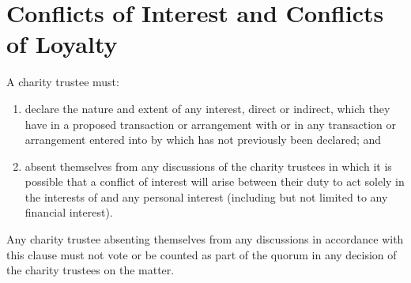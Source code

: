 \section{Conflicts of Interest and Conflicts of Loyalty}
\label{sec:conflicts}
A charity trustee must:
\begin{enumerate}
    \item declare the nature and extent of any interest, direct or indirect, which they have in a proposed transaction or arrangement with \shortname{} or in any transaction or arrangement entered into by \shortname{} which has not previously been declared; and
    \item absent themselves from any discussions of the charity trustees in which it is possible that a conflict of interest will arise between their duty to act solely in the interests of \shortname{} and any personal interest (including but not limited to any  financial interest).
\end{enumerate}
Any charity trustee absenting themselves from any discussions in accordance with this clause must not vote or be counted as part of the quorum in any decision of the charity trustees on the matter.
